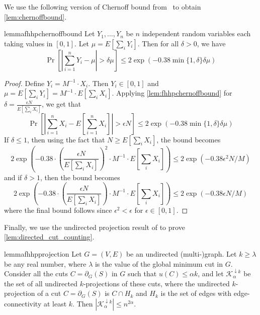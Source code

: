 \documentclass[11pt,a4paper]{article}
\newcommand{\abs}[1]{\ensuremath{\left| #1 \right|}}
\newcommand{\eps}{\epsilon}
\begin{document}
We use the following version of Chernoff bound from~\cite{FHHP19sparsification} to obtain \cref{lem:chernoffbound}.

\begin{restatable}{lemma}{fhhpchernoffbound}
\label{lem:fhhpchernoffbound}
Let $Y_1, \ldots, Y_n$ be $n$ independent random variables each taking values in $[0,1]$. Let $\mu = E[\sum_i Y_i]$. Then for all $\delta > 0$, we have
\[
\Pr \left[ \abs{\sum_{i =1}^n Y_i - \mu} > \delta \mu \right]
\le 2 \exp \left( - 0.38 \min \{ 1, \delta \} \delta \mu \right)
\]
\end{restatable}

\chernoffbound*
\begin{proof}
Define $Y_i = M^{-1} \cdot X_i$. Then $Y_i \in [0,1]$ and $\mu = E[\sum_i Y_i] = M^{-1} \cdot E[\sum_i X_i]$. Applying \cref{lem:fhhpchernoffbound} for $\delta = \frac{\eps N}{E[\sum_i X_i]}$, we get that
\[
\Pr \left[ \abs{\sum_{i = 1}^n X_i - E\left[ \sum_{i = 1}^n X_i \right] } > \eps N \right]
\le 2 \exp \left( - 0.38 \min \{ 1, \delta \} \delta \mu \right)
\]
If $\delta \le 1$, then using the fact that $N \ge E[\sum_i X_i]$, the bound becomes
\[
2 \exp \left( - 0.38 \cdot \left( \frac{\eps N}{E[\sum_i X_i]} \right)^2 \cdot M^{-1} \cdot E\left[ \sum_i X_i \right] \right)
\le 2 \exp \left( - 0.38 \eps^2 N / M \right)
\]
and if $\delta > 1$, then the bound becomes
\[
2 \exp \left( - 0.38 \cdot \left( \frac{\eps N}{E[\sum_i X_i]} \right) \cdot M^{-1} \cdot E\left[ \sum_i X_i \right] \right)
\le 2 \exp \left( - 0.38 \eps N / M \right)
\]
where the final bound follows since $\eps^2 < \eps$
for $\eps \in [0,1]$.
\end{proof}

Finally, we use the undirected projection result of \cite{FHHP19sparsification} to prove \cref{lem:directed_cut_counting}.

\begin{restatable}{lemma}{fhhpprojection}
\label{lem:fhhpprojection}
Let $G = (V, E)$ be an undirected (multi-)graph. Let $k \ge \lambda$ be any real number, where $\lambda$ is the value of the global minimum cut in $G$. Consider all the cuts $C = \partial_G(S)$ in $G$ such that $u(C) \le \alpha k$, and let $\mathcal K^{\downarrow k}_{\alpha}$ be the set of all undirected $k$-projections of these cuts, where the undirected $k$-projection of a cut $C = \partial_G(S)$ is $C \cap H_k$ and $H_k$ is the set of edges with edge-connectivity at least $k$. Then $|\mathcal K^{\downarrow k}_\alpha| \le n^{2\alpha}$.
\end{restatable}
\end{document}
